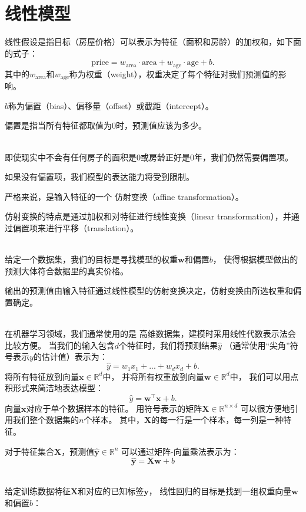 \documentclass[openany,11pt]{book}
\begin{document}
\section{线性模型}


线性假设是指目标（房屋价格）可以表示为特征（面积和房龄）的加权和，如下面的式子：
$$\mathrm{price} = w_{\mathrm{area}} \cdot \mathrm{area} + w_{\mathrm{age}} \cdot \mathrm{age} + b.$$
其中的$w_{\mathrm{area}}$和$w_{\mathrm{age}}$称为权重（weight），权重决定了每个特征对我们预测值的影响。

$b$称为偏置（bias）、偏移量（offset）或截距（intercept）。

偏置是指当所有特征都取值为0时，预测值应该为多少。


~\\
{\color{red} 即使现实中不会有任何房子的面积是0或房龄正好是0年，我们仍然需要偏置项。}

如果没有偏置项，我们模型的表达能力将受到限制。

严格来说，是输入特征的一个 仿射变换（affine transformation）。

仿射变换的特点是通过加权和对特征进行线性变换（linear transformation），并通过偏置项来进行平移（translation）。

~\\
给定一个数据集，我们的目标是寻找模型的权重$\mathbf{w}$和偏置$b$，
使得根据模型做出的预测大体符合数据里的真实价格。

输出的预测值由输入特征通过线性模型的仿射变换决定，仿射变换由所选权重和偏置确定。

~\\
在机器学习领域，我们通常使用的是{\color{red} 高维数据集}，建模时采用线性代数表示法会比较方便。
当我们的输入包含$d$个特征时，我们将预测结果$\hat{y}$
（通常使用“尖角”符号表示$y$的估计值）表示为：
$$\hat{y} = w_1  x_1 + ... + w_d  x_d + b.$$
将所有特征放到向量$\mathbf{x} \in \mathbb{R}^d$中，
并将所有权重放到向量$\mathbf{w} \in \mathbb{R}^d$中，
我们可以用点积形式来简洁地表达模型：
$$\hat{y} = \mathbf{w}^\top \mathbf{x} + b.$$
向量$\mathbf{x}$对应于单个数据样本的特征。
用符号表示的矩阵$\mathbf{X} \in \mathbb{R}^{n \times d}$
可以很方便地引用我们整个数据集的$n$个样本。
其中，$\mathbf{X}$的每一行是一个样本，每一列是一种特征。

对于特征集合$\mathbf{X}$，预测值$\hat{\mathbf{y}} \in \mathbb{R}^n$
可以通过矩阵-向量乘法表示为：
$${\hat{\mathbf{y}}} = \mathbf{X} \mathbf{w} + b$$

~\\
给定训练数据特征$\mathbf{X}$和对应的已知标签$\mathbf{y}$，
线性回归的目标是找到一组权重向量$\mathbf{w}$和偏置$b$：
\end{document}
